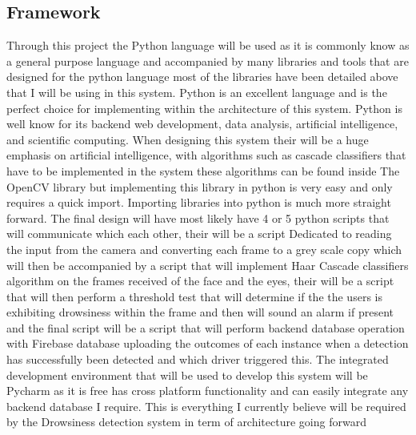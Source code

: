 \subsection{Framework}
Through this project the Python language will be used as it is commonly know as a general purpose language and accompanied by many libraries and tools that are designed for the python language most of the libraries have been detailed above that I will be using in this system.  Python is an excellent language and is the perfect choice for implementing within the architecture of this system. Python is well know for its  backend web development, data analysis, artificial intelligence, and scientific computing. When designing this system their will be a huge emphasis on artificial intelligence, with algorithms such as cascade classifiers that have to be implemented in the system these algorithms can be found inside The OpenCV library but implementing this library in python is very easy and only requires a quick import. Importing libraries into python is much more straight forward. The final design will have most likely have 4 or 5 python scripts that will communicate which each other, their will be a script Dedicated to reading the input from the camera and converting each frame to a grey scale copy which will then be accompanied by a script that will  implement Haar Cascade classifiers algorithm on the frames received of the face and the eyes, their will be a script that will then perform a threshold test that will determine if the the users is exhibiting drowsiness within the frame and then will sound an alarm if present and the final script will be a script that will perform backend database operation with Firebase database uploading the outcomes of each instance when a detection has successfully been detected and which driver triggered this. The integrated development environment that will be used to develop this system will be Pycharm as it is free has cross platform functionality and can easily integrate any backend database I require. 
This is everything I currently believe will be required by the Drowsiness detection system in term of architecture going forward 


